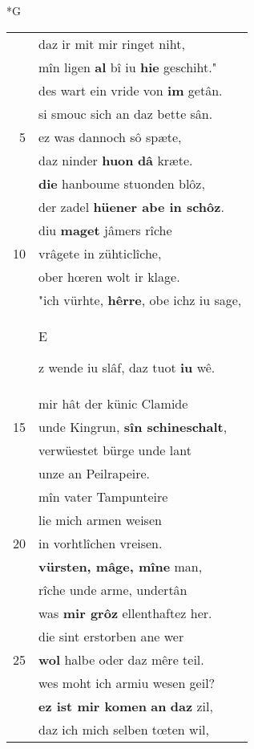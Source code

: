 \documentclass[8pt,a4paper,notitlepage]{article}
\begin{document}
\newpage
\begin{table}[ht]
\begin{minipage}[t]{0.5\linewidth}
\small
\begin{center}*G
\end{center}
\begin{tabular}{rl}
 & daz ir mit mir ringet niht,\\ 
 & mîn ligen \textbf{al} bî iu \textbf{hie} geschiht."\\ 
 & des wart ein vride von \textbf{im} getân.\\ 
 & si smouc sich an daz bette sân.\\ 
5 & ez was dannoch sô spæte,\\ 
 & daz ninder \textbf{huon} \textbf{dâ} kræte.\\ 
 & \textbf{die} hanboume stuonden blôz,\\ 
 & der zadel \textbf{hüener abe in schôz}.\\ 
 & diu \textbf{maget} jâmers rîche\\ 
10 & vrâgete in zühticlîche,\\ 
 & ober hœren wolt ir klage.\\ 
 & "ich vürhte, \textbf{hêrre}, obe ichz iu sage,\\ 
 & \begin{large}E\end{large}z wende iu slâf, daz tuot \textbf{iu} wê.\\ 
 & mir hât der künic Clamide\\ 
15 & unde Kingrun, \textbf{sîn schineschalt},\\ 
 & verwüestet bürge unde lant\\ 
 & unze an Peilrapeire.\\ 
 & mîn vater Tampunteire\\ 
 & lie mich armen weisen\\ 
20 & in vorhtlîchen vreisen.\\ 
 & \textbf{vürsten, mâge, mîne} man,\\ 
 & rîche unde arme, undertân\\ 
 & was \textbf{mir grôz} ellenthaftez her.\\ 
 & die sint erstorben ane wer\\ 
25 & \textbf{wol} halbe oder daz mêre teil.\\ 
 & wes moht ich armiu wesen geil?\\ 
 & \textbf{ez ist mir komen} \textbf{an} \textbf{daz} zil,\\ 
 & daz ich mich selben tœten wil,\\ 

\end{tabular}
\end{minipage}
\end{table}
\end{document}
